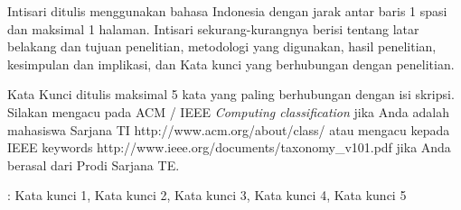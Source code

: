 Intisari ditulis menggunakan bahasa Indonesia dengan jarak antar baris 1 spasi dan maksimal 1 halaman. Intisari sekurang-kurangnya berisi tentang latar belakang dan tujuan penelitian, metodologi yang digunakan, hasil penelitian, kesimpulan dan implikasi, dan Kata kunci yang berhubungan dengan penelitian.

Kata Kunci ditulis maksimal 5 kata yang paling berhubungan dengan isi skripsi. Silakan mengacu pada ACM / IEEE \textit{Computing classification} jika Anda adalah mahasiswa Sarjana TI http://www.acm.org/about/class/ atau mengacu kepada IEEE keywords http://www.ieee.org/documents/taxonomy\_v101.pdf jika Anda berasal dari Prodi Sarjana TE.

 : Kata kunci 1, Kata kunci 2, Kata kunci 3, Kata kunci 4, Kata kunci 5